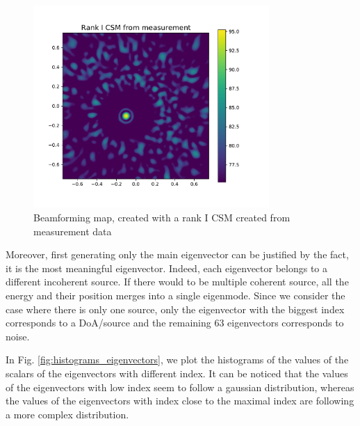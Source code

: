\documentclass[11pt,a4paper,twoside]{report}
\begin{document}
\begin{figure}
    \centering
    \includegraphics[width=0.8\textwidth]{figs/measurement_sample_rank_I_beamforming.pdf}
    \caption{Beamforming map, created with a rank I CSM created from measurement data}
    \label{fig:measurement_sample_rank_I_beamforming}
\end{figure}



Moreover, first generating only the main eigenvector can be justified by the fact, it is the most meaningful eigenvector. Indeed, each eigenvector belongs to a different incoherent source. If there would to be  multiple coherent source, all the energy and their position merges into a single eigenmode. Since we consider the case where there is only one source, only the eigenvector with the biggest index corresponds to a DoA/source and the remaining 63 eigenvectors corresponds to noise.  

In Fig. \ref{fig:histograms_eigenvectors}, we plot the histograms of the values of the scalars of the eigenvectors with different index. It can be noticed that the values of the eigenvectors with low index seem to follow a gaussian distribution, whereas the values of the eigenvectors with index close to the maximal index are following a more complex distribution.
\end{document}

